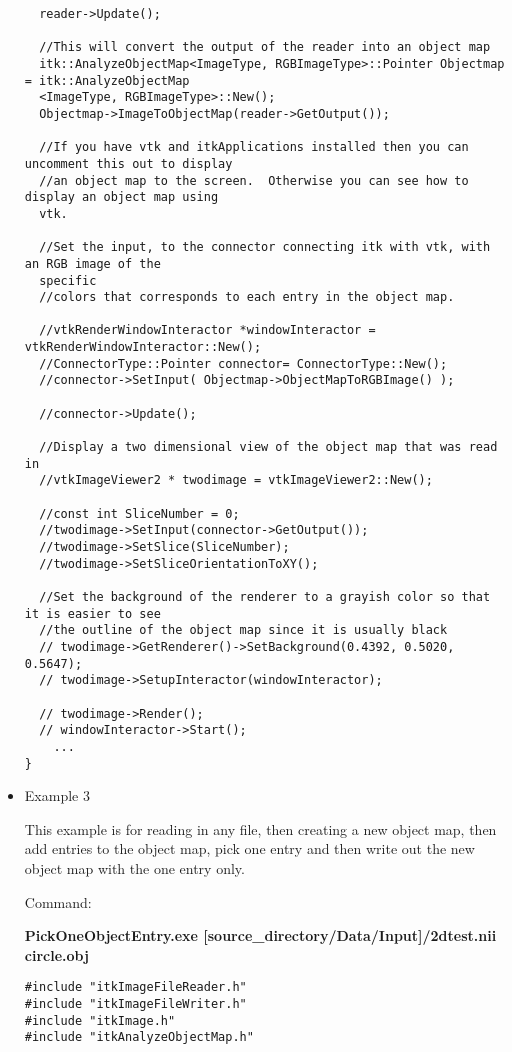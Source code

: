 \documentclass{InsightArticle}
\begin{document}
\begin{itemize}
\begin{verbatim}
  reader->Update();
  
  //This will convert the output of the reader into an object map
  itk::AnalyzeObjectMap<ImageType, RGBImageType>::Pointer Objectmap = itk::AnalyzeObjectMap
  <ImageType, RGBImageType>::New();
  Objectmap->ImageToObjectMap(reader->GetOutput());
  
  //If you have vtk and itkApplications installed then you can uncomment this out to display
  //an object map to the screen.  Otherwise you can see how to display an object map using 
  vtk.
  
  //Set the input, to the connector connecting itk with vtk, with an RGB image of the 
  specific
  //colors that corresponds to each entry in the object map.
  
  //vtkRenderWindowInteractor *windowInteractor = vtkRenderWindowInteractor::New();
  //ConnectorType::Pointer connector= ConnectorType::New();
  //connector->SetInput( Objectmap->ObjectMapToRGBImage() );
  
  //connector->Update();
  
  //Display a two dimensional view of the object map that was read in
  //vtkImageViewer2 * twodimage = vtkImageViewer2::New();
  
  //const int SliceNumber = 0;
  //twodimage->SetInput(connector->GetOutput());
  //twodimage->SetSlice(SliceNumber);
  //twodimage->SetSliceOrientationToXY();
  
  //Set the background of the renderer to a grayish color so that it is easier to see
  //the outline of the object map since it is usually black
  // twodimage->GetRenderer()->SetBackground(0.4392, 0.5020, 0.5647);
  // twodimage->SetupInteractor(windowInteractor);
   
  // twodimage->Render();
  // windowInteractor->Start();
	...
}
\end{verbatim} \normalsize
                                                                               
\item Example 3

This example is for reading in any file, then creating a new object map, then add entries to the object map, pick one entry and then write out the new object map with the one entry only.

Command:

\textbf{PickOneObjectEntry.exe [source\_directory/Data/Input]/2dtest.nii circle.obj}

\small \begin{verbatim}
#include "itkImageFileReader.h"
#include "itkImageFileWriter.h"
#include "itkImage.h"
#include "itkAnalyzeObjectMap.h"


\end{verbatim}
\end{itemize}
\end{document}
